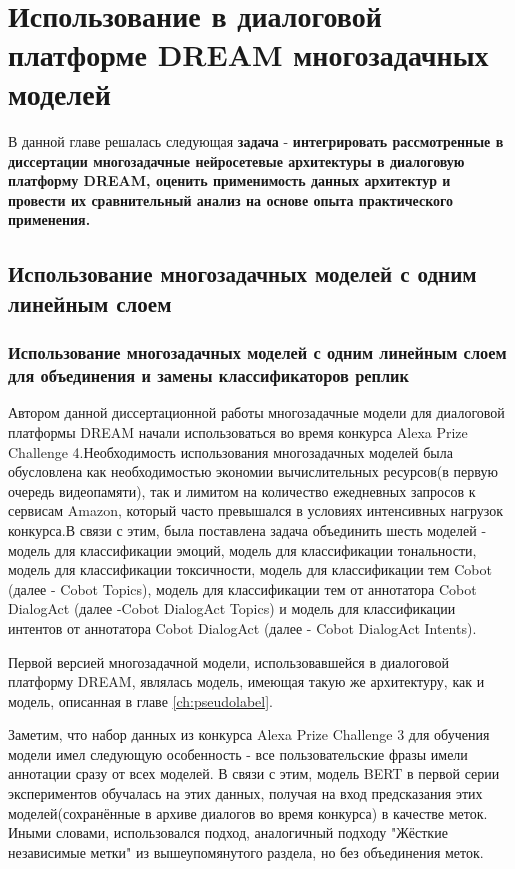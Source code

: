   \chapter{  Использование в диалоговой платформе {DREAM} многозадачных моделей}\label{ch:mtldream}
В данной главе решалась следующая \textbf{задача} - \textbf{интегрировать рассмотренные в диссертации многозадачные нейросетевые архитектуры в диалоговую платформу DREAM, оценить применимость данных архитектур и провести их сравнительный анализ на основе опыта практического применения.}

\section{Использование многозадачных моделей с одним линейным слоем }
\subsection{Использование многозадачных моделей с одним линейным слоем для объединения и замены классификаторов реплик}
Автором данной диссертационной работы многозадачные модели для диалоговой платформы {DREAM} начали использоваться во время конкурса Alexa Prize Challenge 4.Необходимость использования многозадачных моделей была обусловлена как необходимостью экономии вычислительных ресурсов(в первую очередь видеопамяти),
так и лимитом на количество ежедневных запросов к сервисам Amazon, который часто превышался в условиях интенсивных нагрузок конкурса.В связи с этим, была поставлена задача объединить шесть моделей - модель для классификации эмоций, модель для классификации тональности, модель для классификации токсичности, модель для классификации тем Cobot (далее - Cobot Topics), модель для классификации тем от аннотатора Cobot DialogAct (далее -Cobot DialogAct Topics) и модель для классификации интентов от аннотатора Cobot DialogAct (далее - Cobot DialogAct Intents).

Первой версией многозадачной модели, использовавшейся в диалоговой платформу DREAM, являлась модель, имеющая такую же архитектуру,
как и модель, описанная в главе \ref{ch:pseudolabel}.

Заметим, что набор данных из конкурса Alexa Prize Challenge 3 для обучения модели имел следующую особенность - все пользовательские фразы имели аннотации сразу от всех моделей. В связи с этим, модель BERT в первой серии экспериментов обучалась на этих данных, получая на вход предсказания этих моделей(сохранённые в архиве диалогов во время конкурса) в качестве меток. Иными словами, использовался подход, аналогичный подходу "Жёсткие независимые метки" из вышеупомянутого раздела, но без объединения меток. 
 
